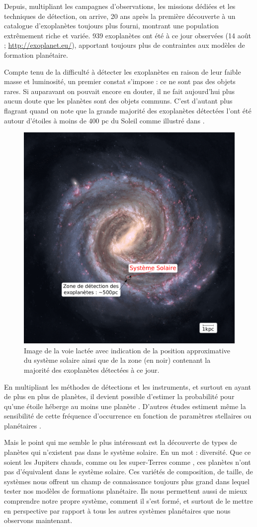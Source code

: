 Depuis, multipliant les campagnes d'observations, les missions dédiées et les techniques de détection, on arrive, 20 ans après la première découverte à un catalogue d'exoplanètes toujours plus fourni, montrant une population extrêmement riche et variée. 939 exoplanètes ont été à ce jour observées (14 août ; \url{http://exoplanet.eu/}), apportant toujours plus de contraintes aux modèles de formation planétaire. 

Compte tenu de la difficulté à détecter les exoplanètes en raison de leur faible masse et luminosité, un premier constat s'impose : ce ne sont pas des objets rares. Si auparavant on pouvait encore en douter, il ne fait aujourd'hui plus aucun doute que les planètes sont des objets communs. C'est d'autant plus flagrant quand on note que la grande majorité des exoplanètes détectées l'ont été autour d'étoiles à moins de 400 pc du Soleil comme illustré dans . 

\begin{figure}[htbp]
\centering
\includegraphics[width=0.45\linewidth]{figure/milky_way_exoplanets.pdf}
\caption{Image de la voie lactée avec indication de la position approximative du système solaire ainsi que de la zone (en noir) contenant la majorité des exoplanètes détectées à ce jour.}\label{fig:milky_way_exoplanet}
\end{figure}


En multipliant les méthodes de détections et les instruments, et surtout en ayant de plus en plus de planètes, il devient possible d'estimer la probabilité pour qu'une étoile héberge au moins une planète \citep{mayor2011road}. D'autres études estiment même la sensibilité de cette fréquence d'occurrence en fonction de paramètres stellaires \citep{fischer2005planet, johnson2007new, howard2012occurrence} ou planétaires \citep{mayor2011road, howard2010occurrence}. 

Mais le point qui me semble le plus intéressant est la découverte de types de planètes qui n'existent pas dans le système solaire. En un mot : diversité. Que ce soient les Jupiters chauds, comme  ou les super-Terres comme , ces planètes n'ont pas d'équivalent dans le système solaire. Ces variétés de composition, de taille, de systèmes nous offrent un champ de connaissance toujours plus grand dans lequel tester nos modèles de formations planétaire. Ils nous permettent aussi de mieux comprendre notre propre système, comment il s'est formé, et surtout de le mettre en perspective par rapport à tous les autres systèmes planétaires que nous observons maintenant.

